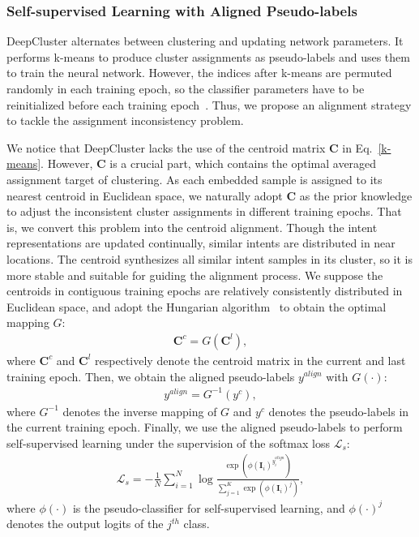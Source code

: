 \documentclass[letterpaper]{article} \usepackage{aaai21}  \usepackage{times}  \usepackage{helvet} \usepackage{courier}  \usepackage[hyphens]{url}  \usepackage{graphicx} \urlstyle{rm} \def\UrlFont{\rm}  \usepackage{natbib}  \usepackage{caption} \frenchspacing  \setlength{\pdfpagewidth}{8.5in}  \setlength{\pdfpageheight}{11in}  \usepackage{amsmath}
\begin{document}
	\subsubsection{Self-supervised Learning with Aligned Pseudo-labels}
	DeepCluster alternates between clustering and updating network parameters. It performs k-means to produce cluster assignments as pseudo-labels and uses them to train the neural network. However, the indices after k-means are permuted randomly in each training epoch, so the classifier parameters have to be reinitialized before each training epoch~\cite{Zhan_2020_CVPR}. Thus, we propose an alignment strategy to tackle the assignment inconsistency problem.
	
	We notice that DeepCluster lacks the use of the centroid matrix $\boldsymbol{C}$ in Eq.~\ref{k-means}. However, $\boldsymbol{C}$ is a crucial part, which contains the optimal averaged assignment target of clustering. As each embedded sample is assigned to its nearest centroid in Euclidean space, we naturally adopt $\boldsymbol{C}$ as the prior knowledge to adjust the inconsistent cluster assignments in different training epochs. That is, we convert this problem into the centroid alignment. Though the intent representations are updated continually, similar intents are distributed in near locations. The centroid synthesizes all similar intent samples in its cluster, so it is more stable and suitable for guiding the alignment process. We suppose the centroids in contiguous training epochs are relatively consistently distributed in Euclidean space, and adopt the Hungarian algorithm~\cite{kuhn1955hungarian} to obtain the optimal mapping $G$:
	\begin{align}
		\boldsymbol{C}^{c} = G(\boldsymbol{C}^{l}),
	\end{align}
	where $\boldsymbol{C}^{c}$ and $\boldsymbol{C}^{l}$ respectively denote the centroid matrix in the current and last training epoch. Then, we obtain the aligned pseudo-labels $y^{align}$ with $G(\cdot)$:
	\begin{align}
		y^{align} = G^{-1}(y^{c}),
	\end{align}
	where $G^{-1}$ denotes the inverse mapping of $G$ and $y^{c}$ denotes the pseudo-labels in the current training epoch. Finally, we use the aligned pseudo-labels to perform self-supervised learning under the supervision of the softmax loss $\mathcal{L}_{s}$:
	\begin{align}
		\mathcal{L}_{s}=-\frac{1}{N}\sum_{i=1}^{N} \log\frac{\exp(\phi(\boldsymbol{I}_{i})^{y_{i}^{align}})}{\sum_{j=1}^{K}\exp(\phi(\boldsymbol{I}_{i})^{j})},
	\end{align}
	where $\phi(\cdot)$ is the pseudo-classifier for self-supervised learning, and $\phi(\cdot)^{j}$ denotes the output logits of the $j^{th}$ class.
	
\end{document}
